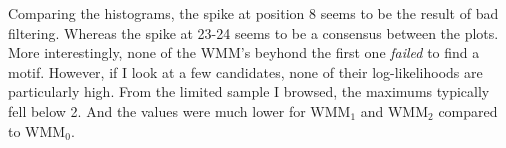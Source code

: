 \documentclass[a4paper, 12pt]{report}
\begin{document}
    Comparing the histograms, the spike at position 8 seems to be the result of bad filtering.
    Whereas the spike at 23-24 seems to be a consensus between the plots.  
    More interestingly, none of the WMM's beyhond the first one \textit{failed} to find a motif.  
    However, if I look at a few candidates, 
        none of their log-likelihoods are particularly high.
    From the limited sample I browsed, the maximums typically fell below 2.
    And the values were much lower for WMM$_1$ and WMM$_2$ compared to WMM$_0$.  
\end{document}
